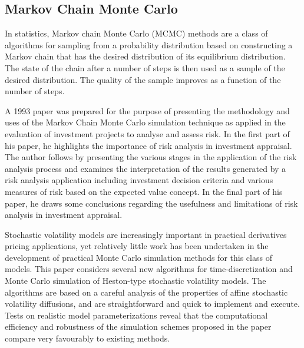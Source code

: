 \subsection{Markov Chain Monte Carlo}

In statistics, Markov chain Monte Carlo (MCMC) methods are a class of algorithms for sampling from a probability distribution based on constructing a Markov chain that has the desired distribution of its equilibrium distribution. The state of the chain after a number of steps is then used as a sample of the desired distribution. The quality of the sample improves as a function of the number of steps.

A 1993 paper was prepared for the purpose of presenting the methodology and uses of the Markov Chain Monte Carlo simulation technique as applied in the evaluation of investment projects to analyse and assess risk.\cite{Savvides:1994aa} In the first part of his paper, he highlights the importance of risk analysis in investment appraisal. The author follows by presenting the various stages in the application of the risk analysis process and examines the interpretation of the results generated by a risk analysis application including investment decision criteria and various measures of risk based on the expected value concept. In the final part of his paper, he draws some conclusions regarding the usefulness and limitations of risk analysis in investment appraisal.

Stochastic volatility models are increasingly important in practical derivatives pricing applications, yet relatively little work has been undertaken in the development of practical Monte Carlo simulation methods for this class of models. This paper considers several new algorithms for time-discretization and Monte Carlo simulation of Heston-type stochastic volatility models.\cite{Andersen:2007aa} The algorithms are based on a careful analysis of the properties of affine stochastic volatility diffusions, and are straightforward and quick to implement and execute. Tests on realistic model parameterizations reveal that the computational efficiency and robustness of the simulation schemes proposed in the paper compare very favourably to existing methods.

